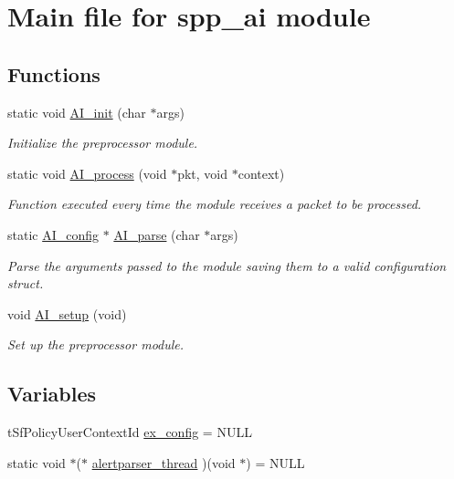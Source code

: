 \hypertarget{group__spp__ai}{
\section{Main file for spp\_\-ai module}
\label{group__spp__ai}
}
\subsection*{Functions}
\begin{DoxyCompactItemize}
\item 
static void \hyperlink{group__spp__ai_ga3524cbdf8fddbcf38c4ed55241002242}{AI\_\-init} (char $\ast$args)
\begin{DoxyCompactList}\small\item\em Initialize the preprocessor module. \item\end{DoxyCompactList}\item 
static void \hyperlink{group__spp__ai_ga57c05cda012c443cb4c358dc327cd3d1}{AI\_\-process} (void $\ast$pkt, void $\ast$context)
\begin{DoxyCompactList}\small\item\em Function executed every time the module receives a packet to be processed. \item\end{DoxyCompactList}\item 
static \hyperlink{structAI__config}{AI\_\-config} $\ast$ \hyperlink{group__spp__ai_gae1c5c4b38ee2819d427848eb3046373e}{AI\_\-parse} (char $\ast$args)
\begin{DoxyCompactList}\small\item\em Parse the arguments passed to the module saving them to a valid configuration struct. \item\end{DoxyCompactList}\item 
void \hyperlink{group__spp__ai_ga1b9ebb5c719c7d9426ddfc1f3da36570}{AI\_\-setup} (void)
\begin{DoxyCompactList}\small\item\em Set up the preprocessor module. \item\end{DoxyCompactList}\end{DoxyCompactItemize}
\subsection*{Variables}
\begin{DoxyCompactItemize}
\item 
tSfPolicyUserContextId \hyperlink{group__spp__ai_ga3dd75596c540d148643fe6d1fdc02628}{ex\_\-config} = NULL
\item 
static void $\ast$($\ast$ \hyperlink{group__spp__ai_gaa3100e48acef5cf4370c3042ff548ed0}{alertparser\_\-thread} )(void $\ast$) = NULL
\end{DoxyCompactItemize}


